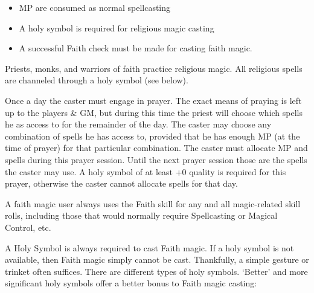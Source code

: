 \documentclass[twoside]{book}
\begin{document}
\begin{itemize}
      
  \item   MP are consumed as normal spellcasting 
  \item   A holy symbol is required for religious magic
                 casting 
  \item   A successful Faith check must be made for casting
                 faith magic. 
\end{itemize}
  
    {  
     Priests, monks, and warriors of faith practice
               religious magic. All religious spells are channeled
               through a holy symbol (see below). 
    }
  
    {  
     Once a day the caster must engage in prayer. The
               exact means of praying is left up to the players \& GM,
               but during this time the priest will choose which spells
               he as access to for the remainder of the day. The caster
               may choose any combination of spells he has access to,
               provided that he has enough MP (at the time of prayer) for
               that particular combination. The caster must allocate MP
               and spells during this prayer session. Until the next
               prayer session those are the spells the caster may use. A
               holy symbol of at least +0 quality is required for this
               prayer, otherwise the caster cannot allocate spells for
               that day. 
    }
  
    {  
     A faith magic user always uses the Faith skill for
               any and all magic-related skill rolls, including those
               that would normally require Spellcasting or Magical
               Control, etc. 
    }
  
    {  
     A Holy Symbol is always required to cast Faith
               magic. If a holy symbol is not available, then Faith magic
               simply cannot be cast. Thankfully, a simple gesture or
               trinket often suffices. There are different types of holy
               symbols. `Better' and more significant holy
               symbols offer a better bonus to Faith magic casting:
               
    }
  
\end{document}
